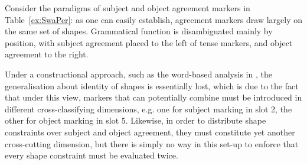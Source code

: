 \documentclass[output=paper
	        ,collection
	        ,collectionchapter
 	        ,biblatex
                ,babelshorthands
                ,newtxmath
                ,draftmode
                ,colorlinks, citecolor=brown
]{langscibook}
\begin{document}
\begin{exe}
\begin{xlist}
\begin{exe}
\begin{xlist}
\begin{table}[hbt]
\end{table}

Consider the paradigms of  subject and object agreement markers
in Table~\ref{ex:SwaPer}: as one can easily establish, agreement
markers draw largely on the same set of shapes. Grammatical function
is disambiguated mainly by position, with subject agreement placed 
to the left of tense markers, and object agreement to the right. 

Under a constructional approach, such as the word-based analysis in
\citet{Koenig99}, the generalisation about identity of shapes is
essentially lost, which is due to the fact that under this view,
markers that can potentially combine must be introduced in different
cross-classifying dimensions, e.g. one for subject marking in slot 2,
the other for object marking in slot 5. Likewise, in order to
distribute shape constraints over subject and object agreement, they
must constitute yet another cross-cutting dimension, but there is
simply no way in this set-up to enforce that every shape constraint
must be evaluated twice.   


\end{xlist}
\end{exe}
\end{xlist}
\end{exe}
\end{document}
